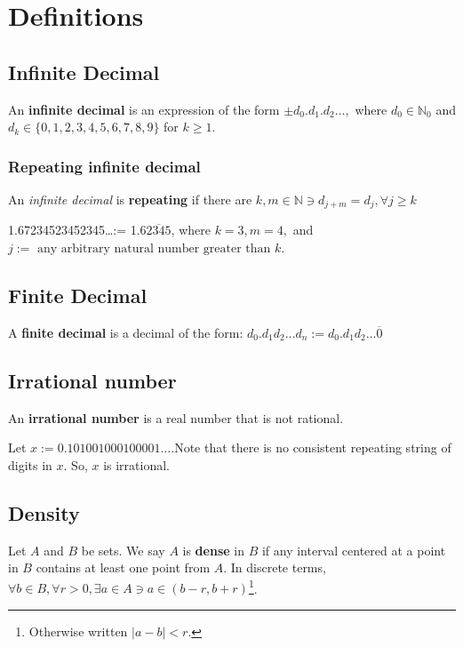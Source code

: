 \documentclass[11pt]{book}
\newcommand{\N}{\mathbb{N}}
\begin{document}
\section{Definitions}
	\subsection{Infinite Decimal}
		\begin{defin}
			An \textbf{infinite decimal} is an expression of the form $\pm d_0.d_1.d_2\dots,$ where
			$d_0 \in \mathbb{N}_0$ and $d_k \in \{0,1,2,3,4,5,6,7,8,9\}$ for $k \geq 1$.
		\end{defin}
	\subsubsection{Repeating infinite decimal}
		\begin{defin}
			An \emph{infinite decimal} is \textbf{repeating} if there are $k,m \in \N \ni d_{j+m} = d_j, \forall j \geq k$
		\end{defin}
		\begin{examp}
			1.67234523452345\dots := 1.6$\overline{2345}$,
			where $k = 3, m = 4,$ and \\$j := \text{ any arbitrary natural number greater than $k$}$.
		\end{examp}
	\subsection{Finite Decimal}
		\begin{defin}
			A \textbf{finite decimal} is a decimal of the form:
			$d_0.d_1d_2\dots d_n := d_0.d_1d_2\dots \overline{0}$
		\end{defin}
	\subsection{Irrational number}
		\begin{defin}
			An \textbf{irrational number} is a real number that is not rational.
		\end{defin}
		\begin{examp}
			Let $x := 0.101001000100001\dots$.Note that there is no consistent repeating string of digits in $x$. 
			So, $x$ is irrational.
		\end{examp}

	\subsection{Density}
		\begin{defin}
			Let $A$ and $B$ be sets. We say $A$ is \textbf{dense} in $B$ if any interval centered at a point in $B$
			contains at least one point from $A$.
			In discrete terms, $\forall b \in B, \forall r > 0, \exists a \in A \ni a \in (b - r, b + r)$\footnote{Otherwise written $|a-b| < r$.}.
		\end{defin}
\end{document}

